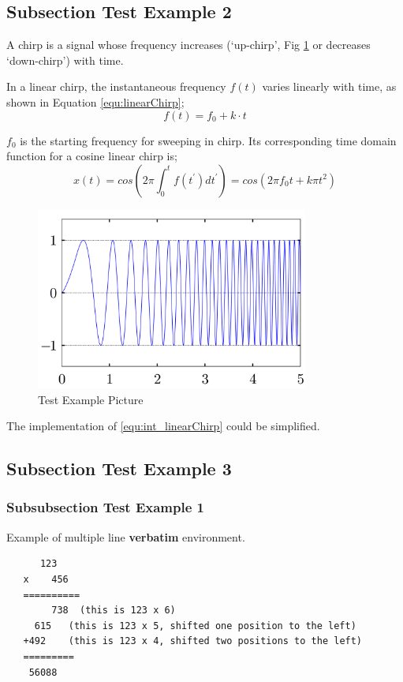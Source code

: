 \subsection{Subsection Test Example 2}

A chirp is a signal whose frequency increases (`up-chirp', Fig \ref{fig:upChirp} or decreases `down-chirp') with time. 

In a linear chirp, the instantaneous frequency $f(t)$ varies linearly with time, as shown in Equation \eqref{equ:linearChirp};
%
\begin{equation}
f(t)=f_0+k \cdot t \label{equ:linearChirp}
\end{equation}

$f_0$  is the starting frequency for sweeping in chirp. Its corresponding time domain function for a cosine linear chirp is;
%
\begin{equation}
x(t)=cos(2\pi \int_0^t f(t^{'})dt^{'})=cos(2\pi f_{0}t+k \pi t^2)  \label{equ:int_linearChirp}  
\end{equation}
%
%
\begin{figure}[!hbp]
\begin{center}
\includegraphics[width=0.8\textwidth]{graphic/2000px-Linear-chirp.svg.png}
\caption{Test Example Picture}
\label{fig:upChirp}
\end{center}
\end{figure}
The implementation of \ref{equ:int_linearChirp} could be simplified.
\subsection{Subsection Test Example 3}

\subsubsection{Subsubsection Test Example 1}
Example of multiple line \textbf{verbatim} environment.
\pagebreak[4]
\begin{verbatim}
      123
   x 	456
   ==========
     	738  (this is 123 x 6)
     615   (this is 123 x 5, shifted one position to the left)
   +492    (this is 123 x 4, shifted two positions to the left)
   =========
    56088
\end{verbatim}

